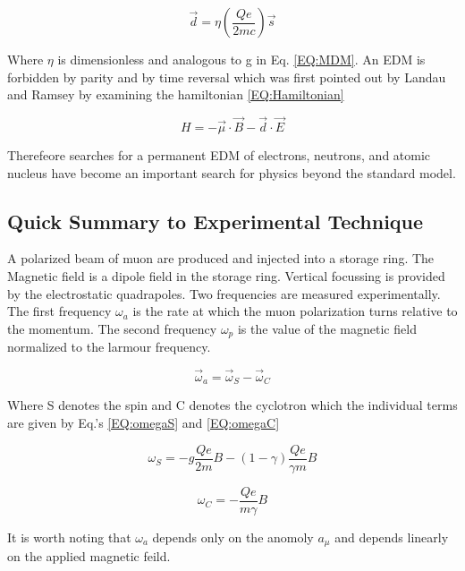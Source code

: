 \documentclass[./Thesis]{subfiles}
\begin{document}
	\begin{equation}\label{EQ:EDM}
		\vec{d} = \eta (\frac{Qe}{2mc}) \vec{s}
	\end{equation}

	Where $\eta$ is dimensionless and analogous to g in Eq. \ref{EQ:MDM}. An EDM is forbidden by parity and by time reversal which was first pointed out by Landau and Ramsey by examining the hamiltonian \ref{EQ:Hamiltonian}
	
	\begin{equation}\label{EQ:Hamiltonian}
	H = -\vec{\mu} \cdot \vec{B} - \vec{d} \cdot \vec{E}
	\end{equation}
	
Therefeore searches for a permanent EDM of electrons, neutrons, and atomic nucleus have become an important search for physics beyond the standard model.


\subsection{Quick Summary to Experimental Technique}

	A polarized beam of muon are produced and injected into a storage ring. The Magnetic field is a dipole field in the storage ring. Vertical focussing is provided by the electrostatic quadrapoles. Two frequencies are measured experimentally. The first frequency $\omega_{a}$ is the rate at which the muon polarization turns relative to the momentum. The second frequency $\omega_p$ is the value of the magnetic field normalized to the larmour frequency.
	
	\begin{equation}
	\vec{\omega}_{a} = \vec{\omega}_{S} - \vec{\omega}_{C}
	\end{equation}

Where S denotes the spin and C denotes the cyclotron which the individual terms are given by Eq.'s \ref{EQ:omegaS} and \ref{EQ:omegaC}

	\begin{equation}\label{EQ:omegaS}
	\omega_{S} = -g \frac{Qe}{2m} B - (1-\gamma)\frac{Qe}{\gamma m} B
	\end{equation}

	\begin{equation}\label{EQ:omegaC}
	\omega_C = - \frac{Qe}{m\gamma} B
	\end{equation}

It is worth noting that $\omega_a$ depends only on the anomoly $a_\mu$ and depends linearly on the applied magnetic feild.
\end{document}
